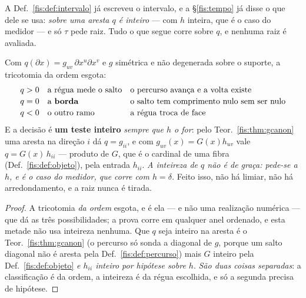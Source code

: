 \documentclass[livro.tex]{subfiles}
\begin{document}
\noindent A Def.~\ref{fis:def:intervalo} já escreveu o intervalo, e a
§\ref{fis:tempo} já disse o que dele se usa: \emph{sobre uma aresta $q$ é
inteiro} --- com $h$ inteira, que é o caso do medidor --- e só $\tau$ pede raiz.
Tudo o que segue corre sobre $q$, e nenhuma raiz é avaliada.

\begin{teorema}\label{fis:thm:tresclasses}
Com $q(\partial x)=g_{uv}\,\partial x^{u}\partial x^{v}$ e $g$ simétrica e não
degenerada sobre o suporte, a tricotomia da ordem esgota:
\[
\begin{array}{lll}
q>0 & \text{a régua mede o salto} & \text{o percurso avança e a volta existe}\\[2pt]
q=0 & \text{a \textbf{borda}} & \text{o salto tem comprimento nulo sem ser nulo}\\[2pt]
q<0 & \text{o outro ramo} & \text{a régua troca de face}
\end{array}
\]
E a decisão é \textbf{um teste inteiro} \emph{sempre que $h$ o for}: pelo
Teor.~\ref{fis:thm:gcanon} uma aresta na direção $i$ dá $q=g_{ii}$, e com
$g_{uv}(x)=G(x)h_{uv}$ vale $q=G(x)\,h_{ii}$ --- produto de $G$, que é o cardinal
de uma fibra (Def.~\ref{fis:def:objeto}), pela entrada $h_{ii}$. \emph{A
inteireza de $q$ não é de graça: pede-se a $h$, e é o caso do medidor, que corre
com $h=\delta$.} Feito isso, não há limiar, não há arredondamento, e a raiz nunca
é tirada.
\end{teorema}

\begin{proof}
A tricotomia \emph{da ordem} esgota, e é ela --- e não uma realização numérica ---
que dá as três possibilidades; a prova corre em qualquer anel ordenado, e esta
metade não usa inteireza nenhuma. Que $q$ seja inteiro na aresta é o
Teor.~\ref{fis:thm:gcanon} (o percurso só sonda a diagonal de $g$, porque um
salto diagonal não é aresta pela Def.~\ref{fis:def:percurso}) mais $G$ inteiro
pela Def.~\ref{fis:def:objeto} \emph{e $h_{ii}$ inteiro por hipótese sobre $h$}.
\emph{São duas coisas separadas}: a classificação é da ordem, a inteireza é da
régua escolhida, e só a segunda precisa de hipótese.
\end{proof}
\end{document}
